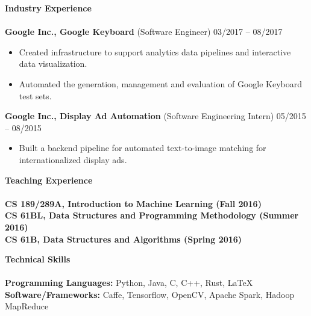 \documentclass{article}
\begin{document}
\noindent
\textbf{{\Large Industry Experience}}\\[-2mm]
\HRule\\
\textbf{Google Inc., Google Keyboard} (Software Engineer)
\hfill 03/2017 -- 08/2017\\
\begin{itemize}
\vspace{-6.5mm}
\item Created infrastructure to support analytics data pipelines and interactive data visualization.
\vspace{-2.5mm}
\item Automated the generation, management and evaluation of Google Keyboard test sets.
\end{itemize}
\vspace{-2mm}

\noindent
\textbf{Google Inc., Display Ad Automation} (Software Engineering Intern)
\hfill 05/2015 -- 08/2015\\
\begin{itemize}
\vspace{-6.5mm}
\item Built a backend pipeline for automated text-to-image matching for internationalized display ads.
\end{itemize}
\vspace{1mm}

\noindent
\textbf{{\Large Teaching Experience}}\\[-2mm]
\HRule\\
\hspace*{1.2mm}\textbf{CS 189/289A, Introduction to Machine Learning (Fall 2016)} \\
\vspace{0.5mm}
\textbf{CS 61BL, Data Structures and Programming Methodology (Summer 2016)} \\
\vspace{0.5mm}
\textbf{CS 61B, Data Structures and Algorithms (Spring 2016)}
\vspace{2.0mm}

\noindent
\textbf{\Large Technical Skills}\\[-2mm]
\HRule\\
\textbf{Programming Languages:} Python, Java, C, C++, Rust, \LaTeX \\
\textbf{Software/Frameworks:} Caffe, Tensorflow, OpenCV, Apache Spark, Hadoop MapReduce


\end{document}
